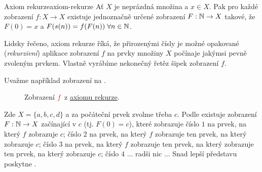 \begin{proposition}{Axiom rekurze}{axiom-rekurze}
 Ať $X$ je neprázdná množina a $x \in X$. Pak pro každé zobrazení $f:X \to X$
 existuje jednoznačně určené zobrazení $F:\mathbb{N} \to X$ takové, že $F(0) = x$ a
 $F(s(n)) = f(F(n)) \; \forall n \in \mathbb{N}$.
\end{proposition}

Lidsky řečeno, axiom rekurze říká, že přirozenými čísly je možné 
opakované (\emph{rekurzivní}) aplikace zobrazení $f$ na prvky množiny $X$
počínaje jakýmsi pevně zvoleným prvkem. Vlastně vyrábíme nekonečný řetěz šipek
zobrazení $f$.

Uvažme například zobrazení na .
\begin{figure}[ht]
 \centering

 \caption{Zobrazení $\clr{f}$ z \hyperref[prop:axiom-rekurze]{axiomu rekurze}.}
 \label{fig:zobrazeni-axiom-rekurze}
\end{figure}

Zde $X = \{a,b,c,d\}$ a za počáteční prvek zvolme třeba $c$. Podle
 existuje zobrazení $F:\mathbb{N} \to X$ začínající v
$c$ (tj. $F(0) = c$), které zobrazuje číslo $1$ na prvek, na který $f$ zobrazuje
$c$; číslo $2$ na prvek, na který $f$ zobrazuje ten prvek, na který zobrazuje
$c$; číslo $3$ na prvek, na který $f$ zobrazuje ten prvek, na který zobrazuje
ten prvek, na který zobrazuje $c$; číslo $4$ ... radši nic ... Snad lepší
představu poskytne .

